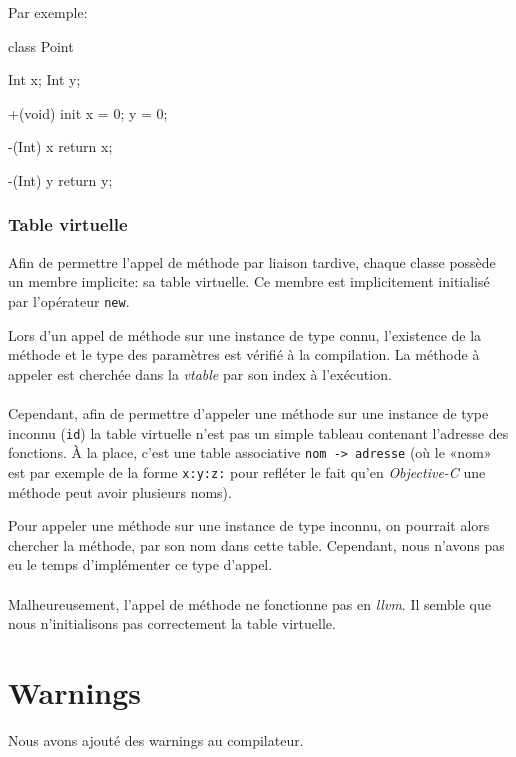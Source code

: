 \documentclass{scrartcl}
\newcommand{\llvm}{\textit{llvm}}
\newcommand{\objc}{\textit{Objective-C}}
\begin{document}
    Par exemple:
    \begin{moccode}
class Point {
    Int x;
    Int y;

    +(void) init {
      x = 0; y = 0;
    }

    -(Int) x {
        return x;
    }

    -(Int) y {
        return y;
    }
}
    \end{moccode}

    \subsubsection{Table virtuelle}\label{sec:vtable}
      Afin de permettre l'appel de méthode par liaison tardive, chaque classe
      possède un membre implicite: sa table virtuelle. Ce membre est
      implicitement initialisé par l'opérateur \verb+new+.

      Lors d'un appel de méthode sur une instance de type connu, l'existence de
      la méthode et le type des paramètres est vérifié à la compilation. La
      méthode à appeler est cherchée dans la \textit{vtable} par son index à
      l'exécution.

      \paragraph{}
      Cependant, afin de permettre d'appeler une méthode sur une instance de
      type inconnu (\verb+id+) la table virtuelle n'est pas un simple tableau
      contenant l'adresse des fonctions. À la place, c'est une table
      associative \verb+nom -> adresse+ (où le «nom» est par exemple de la
      forme \verb+x:y:z:+ pour refléter le fait qu'en \objc{} une méthode peut
      avoir plusieurs noms).

      Pour appeler une méthode sur une instance de type inconnu, on pourrait
      alors chercher la méthode, par son nom dans cette table. Cependant, nous
      n'avons pas eu le temps d'implémenter ce type d'appel.

      \paragraph{}
      Malheureusement, l'appel de méthode ne fonctionne pas en \llvm{}. Il
      semble que nous n'initialisons pas correctement la table virtuelle.

\section{Warnings}\label{sec:warnings}
  Nous avons ajouté des warnings au compilateur.
\end{document}
